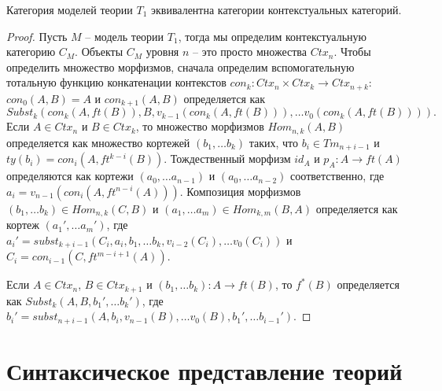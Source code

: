 \documentclass{amsart}
\theoremstyle{definition}
\theoremstyle{remark}
\numberwithin{figure}{section}
\begin{document}
\begin{prop}
Категория моделей теории $T_1$ эквивалентна категории контекстуальных категорий.
\end{prop}
\begin{proof}
Пусть $M$ -- модель теории $T_1$, тогда мы определим контекстуальную категорию $C_M$.
Объекты $C_M$ уровня $n$ -- это просто множества $Ctx_n$.
Чтобы определить множество морфизмов, сначала определим вспомогательную тотальную функцию конкатенации контекстов $con_k : Ctx_n \times Ctx_k \to Ctx_{n+k}$:
$con_0(A, B) = A$ и $con_{k+1}(A, B)$ определяется как
\[ Subst_k(con_k(A, ft(B)), B, v_{k-1}(con_k(A, ft(B))), \ldots v_0(con_k(A, ft(B)))). \]
Если $A \in Ctx_n$ и $B \in Ctx_k$, то множество морфизмов $Hom_{n,k}(A, B)$ определяется как множество кортежей $(b_1, \ldots b_k)$ таких, что $b_i \in Tm_{n+i-1}$ и $ty(b_i) = con_i(A, ft^{k-i}(B))$.
Тождественный морфизм $id_A$ и $p_A : A \to ft(A)$ определяются как кортежи $(a_0, \ldots a_{n-1})$ и $(a_0, \ldots a_{n-2})$ соответственно, где $a_i = v_{n-1}(con_i(A, ft^{n-i}(A)))$.
Композиция морфизмов $(b_1, \ldots b_k) \in Hom_{n,k}(C, B)$ и $(a_1, \ldots a_m) \in Hom_{k,m}(B, A)$ определяется как кортеж $(a_1', \ldots a_m')$, где
$a_i' = subst_{k+i-1}(C_i, a_i, b_1, \ldots b_k, v_{i-2}(C_i), \ldots v_0(C_i))$ и $C_i = con_{i-1}(C, ft^{m-i+1}(A))$.

Если $A \in Ctx_n$, $B \in Ctx_{k+1}$ и $(b_1, \ldots b_k) : A \to ft(B)$, то $f^*(B)$ определяется как $Subst_k(A, B, b_1', \ldots b_k')$, где $b_i' = subst_{n+i-1}(A, b_i, v_{n-1}(B), \ldots v_0(B), b_1', \ldots b_{i-1}')$.

\end{proof}

\section{Синтаксическое представление теорий}
\end{document}
